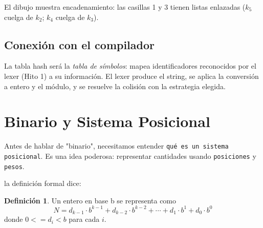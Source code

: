 \documentclass[10pt,a4paper]{article}
\theoremstyle{definition}
\newtheorem{definicion}{Definición}[section]
\begin{document}
\begin{center}
    \shorthandoff{<>}
    \shorthandon{<>}

\end{center}

El dibujo muestra encadenamiento: las casillas 1 y 3 tienen listas enlazadas ($k_5$ cuelga de $k_2$; $k_4$ cuelga de $k_3$).

\subsection{Conexión con el compilador}

La tabla hash será la \emph{tabla de símbolos}: mapea identificadores reconocidos
por el lexer (Hito 1) a su información. El lexer produce el string, se aplica la conversión a entero
y el módulo, y se resuelve la colisión con la estrategia elegida.

\section{Binario y Sistema Posicional}

Antes de hablar de "binario", necesitamos entender \texttt{qué es un sistema posicional}. Es una idea poderosa:
representar cantidades usando \texttt{posiciones} y \texttt{pesos}.

la definición formal dice:

\begin{definicion}

    Un entero en base b se representa como
    \[
       N = d_{k-1} \cdot b^{k-1} + d_{k-2} \cdot b^{k-2}
            + \cdots + d_1 \cdot b^1 + d_0 \cdot b^0
        \]
       donde $0 <= d_i < b$ para cada $i$.
    
\end{definicion}
\end{document}
